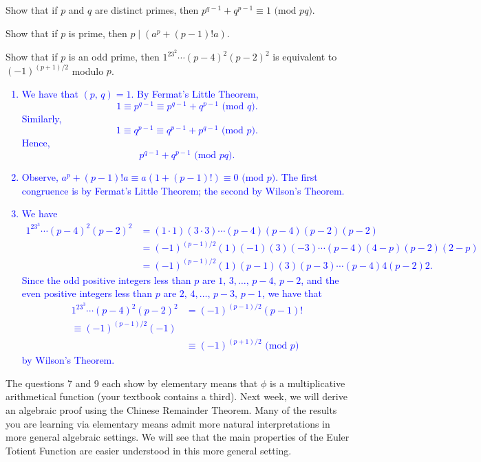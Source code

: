 \documentclass[a4paper,11pt]{article}
\theoremstyle{mythm}
\theoremstyle{mydef}
\newcommand{\blue}[1]{\textcolor{blue}{#1}}
\renewcommand{\pmod}[1]{\text{ (mod $#1$)}}
\begin{document}
\begin{enumerate*}[{\bf (a)}]
\item Show that if $p$ and $q$ are distinct primes, then $p^{q-1}+q^{p-1} \equiv
  1 \pmod{pq}$.
\item Show that if $p$ is prime, then $p \mid (a^p+(p-1)!a)$.
\item Show that if $p$ is an odd prime, then $1^23^2 \cdots (p-4)^2(p-2)^2$ is
  equivalent to $(-1)^{(p+1)/2}$ modulo $p$.
\end{enumerate*}

\blue{
  \begin{enumerate}[{\bf (a)}]
  \item We have that $(p,\,q)=1$. By Fermat's Little Theorem,
    \[
      1 \equiv p^{q-1} \equiv p^{q-1} + q^{p-1} \pmod{q}.
    \]
    Similarly,
    \[
      1 \equiv q^{p-1} \equiv q^{p-1} + p^{q-1} \pmod{p}.
    \]
    Hence,
    \[
      p^{q-1} + q^{p-1} \pmod{pq}.
    \]
  \item Observe, $a^p+(p-1)!a \equiv a(1+(p-1)!) \equiv 0 \pmod{p}$. The first
    congruence is by Fermat's Little Theorem; the second by Wilson's Theorem.
  \item We have
    \begin{align*}
      1^23^3 \cdots (p-4)^2(p-2)^2&=(1\cdot1)(3\cdot3)\cdots(p-4)(p-4)(p-2)(p-2)\\
      &= (-1)^{(p-1)/2}(1)(-1)(3)(-3) \cdots (p-4)(4-p)(p-2)(2-p) \\
      &= (-1)^{(p-1)/2}(1)(p-1)(3)(p-3) \cdots (p-4)4(p-2)2.
    \end{align*}
    Since the odd positive integers less than $p$ are $1,\,3,\dots,\,p-4,\,p-2$,
    and the even positive integers less than $p$ are $2,\,4,\dots,\,p-3,\,p-1$,
    we have that
    \begin{align*}
      1^23^3 \cdots (p-4)^2(p-2)^2 &= (-1)^{(p-1)/2}(p-1)! \\
      \equiv (-1)^{(p-1)/2}(-1) \\
      &\equiv (-1)^{(p+1)/2} \pmod{p}
    \end{align*}
    by Wilson's Theorem.
  \end{enumerate}
}

The questions 7 and 9 each show by elementary means that $\phi$ is a
multiplicative arithmetical function (your textbook contains a third). Next
week, we will derive an algebraic proof using the Chinese Remainder Theorem.
Many of the results you are learning via elementary means admit more natural
interpretations in more general algebraic settings. We will see that the main
properties of the Euler Totient Function are easier understood in this more
general setting. \\
\end{document}

